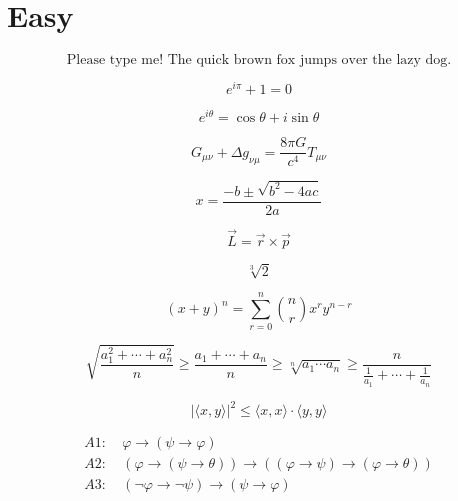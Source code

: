 \documentclass{article}
\begin{document}
\section{Easy}
\begin{equation}
\textrm{Please type me! The quick brown fox jumps over the lazy dog.}
\end{equation}

\begin{equation}
e^{i\pi}+1=0
\end{equation}

\begin{equation}
e^{i\theta}=\cos\theta+i\sin\theta
\end{equation}

\begin{equation}
G_{\mu\nu}+\Delta g_{\nu\mu}= {\frac{{8\pi G}}{c^4}}T_{\mu\nu}
\end{equation}

\begin{equation}
x=\frac{-b\pm\sqrt{b^2-4ac}}{2a}
\end{equation}

\begin{equation}
\overrightarrow{L}=\overrightarrow{r}\times\overrightarrow{p}
\end{equation}

\begin{equation}
\sqrt[3]{2}
\end{equation}

\begin{equation}
(x+y)^n=\sum_{r=0}^n\binom{n}{r}x^ry^{n-r}
\end{equation}

\begin{equation}
\sqrt{\frac{a_{1}^{2}+\cdots+a_{n}^2}{n}}\geq{\frac{a_{1}+\cdots+a_{n}}{n}}\geq\sqrt[n]{a_{1}\cdots a_{n}}\geq \frac{n}{{\frac{1}{a_{1}}+\cdots+\frac{1}{a_{n}}}}
\end{equation}

\begin{equation}
{\vert{\langle{x,y}\rangle}\vert}^{2}\leq\langle{x,x}\rangle\cdot \langle{y,y}\rangle
\end{equation}

\begin{equation}
\begin{aligned}
A1:& \ \varphi \longrightarrow (\psi\longrightarrow\varphi) \\
A2:& \ (\varphi\rightarrow(\psi\rightarrow\theta)) \longrightarrow((\varphi \rightarrow \psi) \rightarrow (\varphi \rightarrow \theta)) \\
A3:& \ (\neg \varphi \rightarrow \neg \psi) \longrightarrow (\psi \rightarrow \varphi)
\end{aligned}
\end{equation}
\end{document}
